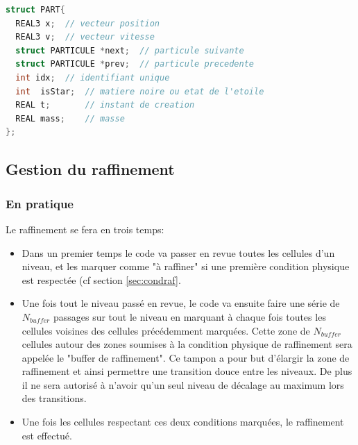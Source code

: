 \begin{lstlisting}[float=bth,language=C,frame=tb,caption={La structure PARTICULE de EMMA},label=lst:part]
struct PART{
  REAL3 x;  // vecteur position
  REAL3 v;  // vecteur vitesse
  struct PARTICULE *next;  // particule suivante
  struct PARTICULE *prev;  // particule precedente
  int idx;  // identifiant unique
  int  isStar;  // matiere noire ou etat de l'etoile
  REAL t;       // instant de creation
  REAL mass;    // masse
};
\end{lstlisting}



\subsection{Gestion du raffinement}
\label{sec:raffinement}

\subsubsection{En pratique}
Le raffinement se fera en trois temps:

\begin{itemize}
\item Dans un premier temps le code va passer en revue toutes les cellules d'un niveau, et les marquer comme "à raffiner" si une première condition physique est respectée (cf section \ref{sec:condraf}.

\item Une fois tout le niveau passé en revue, le code va ensuite faire une série de $N_{buffer}$ passages sur tout le niveau en marquant à chaque fois toutes les cellules voisines des cellules précédemment marquées.
Cette zone de $N_{buffer}$ cellules autour des zones soumises à la condition physique de raffinement sera appelée le "buffer de raffinement".
Ce tampon a pour but d’élargir la zone de raffinement et ainsi permettre une transition douce entre les niveaux.
De plus il ne sera autorisé à n'avoir qu'un seul niveau de décalage au maximum lors des transitions.

\item Une fois les cellules respectant ces deux conditions marquées, le raffinement est effectué.
\end{itemize}

